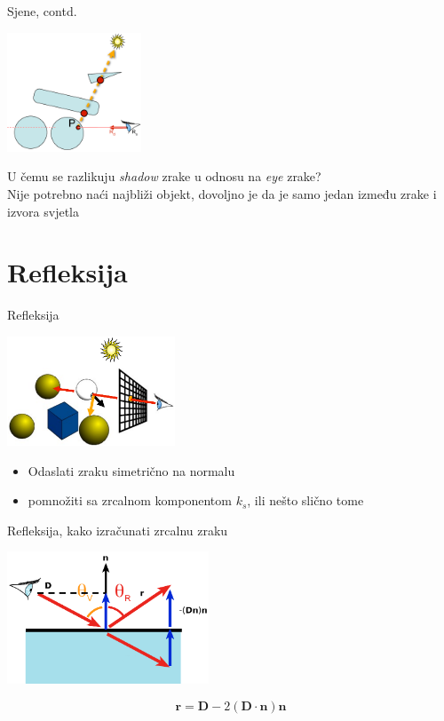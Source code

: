 \documentclass[9pt]{beamer}
\begin{document}
\begin{frame}{Sjene, contd.}
\begin{center}
\includegraphics[width=4cm]{slike/sjene_02.png}
\end{center}
U čemu se razlikuju \textit{shadow} zrake u odnosu na \textit{eye} zrake?\\
Nije potrebno naći najbliži objekt, dovoljno je da je samo jedan između zrake i izvora svjetla 
\end{frame}

\section{Refleksija}
\begin{frame}{Refleksija}

\begin{center}
\includegraphics[width=5cm]{slike/refleksija_01.png}
\end{center}
\begin{itemize}
\item Odaslati zraku simetrično na normalu
\item pomnožiti sa zrcalnom komponentom $k_s$, ili nešto slično tome
\end{itemize}
\end{frame}

\begin{frame}{Refleksija, kako izračunati zrcalnu zraku}

\begin{center}
\includegraphics[width=6cm]{slike/refleksija_02.png}
\end{center}
$$\mathbf{r} = \mathbf{D} - 2(\mathbf{D}\cdot \mathbf{n})\mathbf{n}$$
\end{frame}
\end{document}
